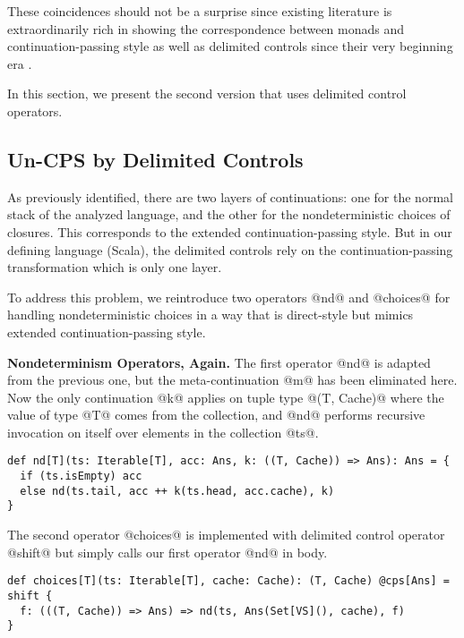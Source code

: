 \documentclass[acmsmall]{acmart}\settopmatter{}
\begin{document}
These coincidences should not be a surprise since existing literature is extraordinarily rich
in showing the correspondence between monads and continuation-passing style as well as
delimited controls since their very beginning era \cite{Danvy:1990:AC:91556.91622, wadler1992essence,
danvy1992representing, moggi1991notions}.

In this section, we present the second version that uses delimited control operators.

\subsection{Un-CPS by Delimited Controls} \label{uncps}

As previously identified, there are two layers of continuations: one for the normal stack 
of the analyzed language, and the other for the nondeterministic choices of closures.
This corresponds to the extended continuation-passing style.
But in our defining language (Scala), the delimited controls rely on the continuation-passing 
transformation which is only one layer.

To address this problem, we reintroduce two operators @nd@ and @choices@ for handling 
nondeterministic choices in a way that is direct-style but mimics extended 
continuation-passing style.

\textbf{Nondeterminism Operators, Again.}
The first operator @nd@ is adapted from the previous one, but the meta-continuation
@m@ has been eliminated here. Now the only continuation @k@ applies on tuple type @(T, Cache)@ 
where the value of type @T@ comes from the collection, and @nd@ performs recursive invocation
on itself over elements in the collection @ts@. 

\begin{lstlisting}
def nd[T](ts: Iterable[T], acc: Ans, k: ((T, Cache)) => Ans): Ans = {
  if (ts.isEmpty) acc
  else nd(ts.tail, acc ++ k(ts.head, acc.cache), k)
}
\end{lstlisting}

The second operator @choices@ is implemented with delimited control operator 
@shift@ but simply calls our first operator @nd@ in body.

\begin{lstlisting}
def choices[T](ts: Iterable[T], cache: Cache): (T, Cache) @cps[Ans] = shift {
  f: (((T, Cache)) => Ans) => nd(ts, Ans(Set[VS](), cache), f)
}
\end{lstlisting}
\end{document}
